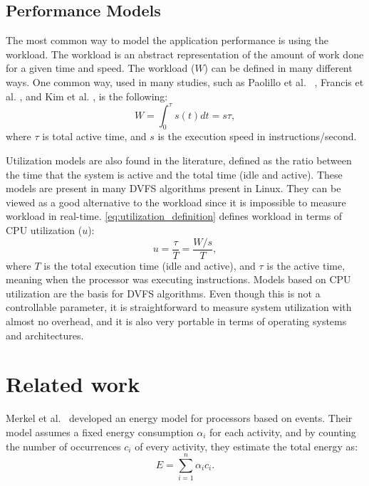 \subsection{Performance Models}
The most common way to model the application performance is using the workload. The workload is an abstract representation of the amount of work done for a given time and speed. The workload ($W$) can be defined in many different ways. One common way, used in many studies, such as Paolillo et al. ~\cite{Paolillo2018OptimisationParallelism}, Francis et al. \cite{ Group2012HandbookSahni}, and Kim et al. \cite{Kim2015RacingHeuristics}, is the following:
\begin{equation}
W = \int_{0}^{\tau}s(t)dt = s\tau,
\label{eq:workload_definition}
\end{equation}
where $\tau$ is total active time, and $s$ is the execution speed in instructions/second.

Utilization models \cite{Fu2018RaceMinimization, Group2012HandbookSahni} are also found in the literature, defined as the ratio between the time that the system is active and the total time (idle and active). These models are present in many DVFS algorithms present in Linux. They can be viewed as a good alternative to the workload since it is impossible to measure workload in real-time.  \cref{eq:utilization_definition} defines workload in terms of CPU utilization ($u$):
\begin{equation}
u = \frac{\tau}{T} = \frac{W/s}{T},
\label{eq:utilization_definition}
\end{equation}
where $T$ is the total execution time (idle and active), and $\tau$ is the active time, meaning when the processor was executing instructions.
Models based on CPU utilization are the basis for DVFS algorithms. Even though this is not a controllable parameter, it is straightforward to measure system utilization with almost no overhead, and it is also very portable in terms of operating systems and architectures.

\section{Related work} \label{sec:related_work}

Merkel et al.~\cite{Merkel2006BalancingSystems} developed an energy model for processors based on events. Their model assumes a fixed energy consumption $\alpha_i$ for each activity, and by counting the number of occurrences $c_i$ of every activity, they estimate the total energy as:
\begin{equation}
E = \sum_{i=1}^{n}\alpha_ic_i.
\label{equation:rw_merkel}
\end{equation}

